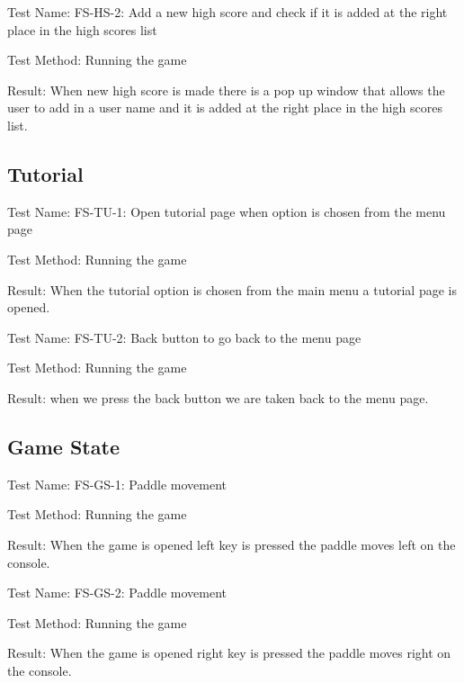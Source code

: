 \documentclass{article}
\begin{document}
\vspace{5mm}


Test Name: FS-HS-2: Add a new high score and check if it is added at the right place in the high scores list \par
Test Method: Running the game \par
Result: When new high score is made there is a pop up window that allows the user to add in a user name and it is added at the right place in the high scores list. \par

\vspace{5mm}


\subsection {Tutorial} 
Test Name: FS-TU-1: Open tutorial page when option is chosen from the menu page \par
Test Method: Running the game \par
Result: When the tutorial option is chosen from the main menu a tutorial page is opened. \par

\vspace{5mm}


Test Name: FS-TU-2: Back button to go back to the menu page \par
Test Method: Running the game \par
Result: when we press the back button we are taken back to the menu page. \par

\vspace{5mm}


\subsection { Game State}
Test Name: FS-GS-1: Paddle movement \par
Test Method: Running the game \par
Result: When the game is opened left key is pressed the paddle moves left on the console. \par

\vspace{5mm}


Test Name: FS-GS-2: Paddle movement \par
Test Method: Running the game \par
Result: When the game is opened right key is pressed the paddle moves right on the console. \par
\end{document}
